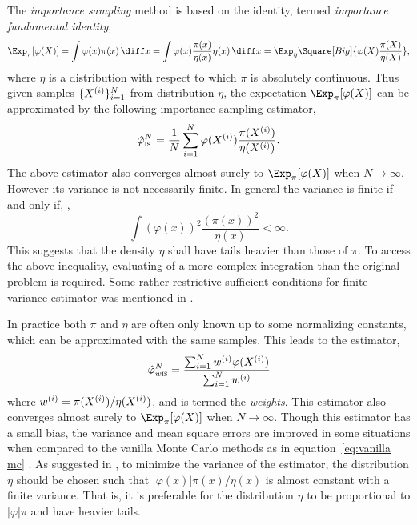 The \emph{importance sampling} method is based on the identity, termed
\emph{importance fundamental identity},
\begin{equation}
  \Exp_{\pi}[\varphi(X)]
  = \int\varphi(x)\pi(x)\intd x
  = \int\varphi(x)\frac{\pi(x)}{\eta(x)}\eta(x)\intd x
  = \Exp_{\eta}\Square[Big]{\varphi(X)\frac{\pi(X)}{\eta(X)}},
\end{equation}
where $\eta$ is a distribution with respect to which $\pi$ is absolutely
continuous. Thus given \iid samples $\{X^{(i)}\}_{i=1}^N$ from distribution
$\eta$, the expectation $\Exp_{\pi}[\varphi(X)]$ can be approximated by the
following importance sampling estimator,
\begin{equation}
  \hat\varphi_{\text{\textsc{is}}}^N
  = \frac{1}{N}\sum_{i=1}^N\varphi(X^{(i)})\frac{\pi(X^{(i)})}{\eta(X^{(i)})}.
\end{equation}
The above estimator also converges almost surely to $\Exp_{\pi}[\varphi(X)]$
when $N\to\infty$. However its variance is not necessarily finite. In general
the variance is finite if and only if,
\parencite[see][sec.~3.3]{Robert:2004tn},
\begin{equation}
  \int(\varphi(x))^2\frac{(\pi(x))^2}{\eta(x)} < \infty.
\end{equation}
This suggests that the density $\eta$ shall have tails heavier than those of
$\pi$. To access the above inequality, evaluating of a more complex
integration than the original problem is required. Some rather restrictive
sufficient conditions for finite variance estimator was mentioned in
\textcite{Geweke:1989tm}.

In practice both $\pi$ and $\eta$ are often only known up to some normalizing
constants, which can be approximated with the same samples. This leads to the
estimator,
\begin{equation}
  \hat\varphi_{w\text{\textsc{is}}}^N
  = \frac{\sum_{i=1}^Nw^{(i)}\varphi(X^{(i)})}{\sum_{i=1}^Nw^{(i)}}
\end{equation}
where $w^{(i)} = \pi(X^{(i)})/\eta(X^{(i)})$, and is termed the \emph{weights}.  This
estimator also converges almost surely to $\Exp_{\pi}[\varphi(X)]$ when
$N\to\infty$. Though this estimator has a small bias, the variance and mean
square errors are improved in some situations when compared to the vanilla
Monte Carlo methods as in equation~\eqref{eq:vanilla mc}
\parencite{Casella:1998tj}. As suggested in
\textcite[][sec.~3.3]{Robert:2004tn}, to minimize the variance of the
estimator, the distribution $\eta$ should be chosen such that
$|\varphi(x)|\pi(x)/\eta(x)$ is almost constant with a finite variance. That
is, it is preferable for the distribution $\eta$ to be proportional to
$|\varphi|\pi$ and have heavier tails.

